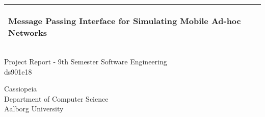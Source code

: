%
\begin{titlepage}
  \addtolength{\hoffset}{0.5\evensidemargin-0.5\oddsidemargin} %
  \noindent%
  \begin{tabular}{@{}p{\textwidth}@{}}
    \toprule[2pt]
    \midrule
    \vspace{0.2cm}
    \begin{center}
    \Huge{\textbf{
      Message Passing Interface for Simulating Mobile Ad-hoc Networks%
    }}
    \end{center}
    \vspace{0.2cm}\\
    \midrule
    \toprule[2pt]
  \end{tabular}
  \vspace{4 cm}
  \begin{center}
    {\large
      Project Report - 9th Semester Software Engineering %
    }\\
    \vspace{0.2cm}
    {\Large
    ds901e18%
    }
  \end{center}
  \vfill
  \begin{center}
  Cassiopeia\\
  Department of Computer Science\\
  Aalborg University
  \end{center}
\end{titlepage}
\clearpage
